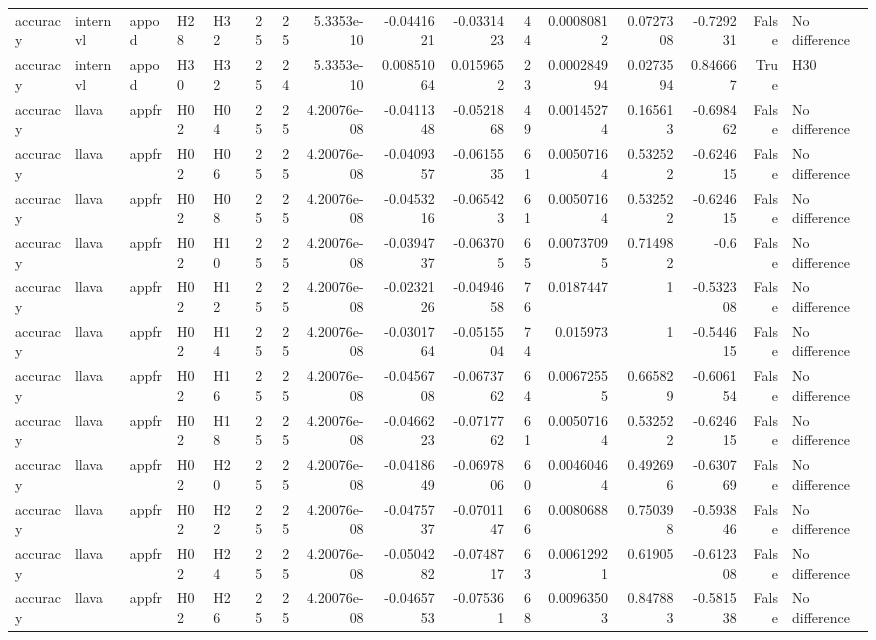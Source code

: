 \begin{longtable}{lllllrrrrrrrrrrl}
accuracy & internvl & appod & H28 & H32 & 25 & 25 & 5.3353e-10 & -0.0441621 & -0.0331423 & 44 & 0.00080812 & 0.0727308 & -0.729231 & False & No difference \\
accuracy & internvl & appod & H30 & H32 & 25 & 24 & 5.3353e-10 & 0.00851064 & 0.0159652 & 23 & 0.000284994 & 0.0273594 & 0.846667 & True & H30 \\
accuracy & llava & appfr & H02 & H04 & 25 & 25 & 4.20076e-08 & -0.0411348 & -0.0521868 & 49 & 0.00145274 & 0.165613 & -0.698462 & False & No difference \\
accuracy & llava & appfr & H02 & H06 & 25 & 25 & 4.20076e-08 & -0.0409357 & -0.0615535 & 61 & 0.00507164 & 0.532522 & -0.624615 & False & No difference \\
accuracy & llava & appfr & H02 & H08 & 25 & 25 & 4.20076e-08 & -0.0453216 & -0.065423 & 61 & 0.00507164 & 0.532522 & -0.624615 & False & No difference \\
accuracy & llava & appfr & H02 & H10 & 25 & 25 & 4.20076e-08 & -0.0394737 & -0.063705 & 65 & 0.00737095 & 0.714982 & -0.6 & False & No difference \\
accuracy & llava & appfr & H02 & H12 & 25 & 25 & 4.20076e-08 & -0.0232126 & -0.0494658 & 76 & 0.0187447 & 1 & -0.532308 & False & No difference \\
accuracy & llava & appfr & H02 & H14 & 25 & 25 & 4.20076e-08 & -0.0301764 & -0.0515504 & 74 & 0.015973 & 1 & -0.544615 & False & No difference \\
accuracy & llava & appfr & H02 & H16 & 25 & 25 & 4.20076e-08 & -0.0456708 & -0.0673762 & 64 & 0.00672555 & 0.665829 & -0.606154 & False & No difference \\
accuracy & llava & appfr & H02 & H18 & 25 & 25 & 4.20076e-08 & -0.0466223 & -0.0717762 & 61 & 0.00507164 & 0.532522 & -0.624615 & False & No difference \\
accuracy & llava & appfr & H02 & H20 & 25 & 25 & 4.20076e-08 & -0.0418649 & -0.0697806 & 60 & 0.00460464 & 0.492696 & -0.630769 & False & No difference \\
accuracy & llava & appfr & H02 & H22 & 25 & 25 & 4.20076e-08 & -0.0475737 & -0.0701147 & 66 & 0.0080688 & 0.750398 & -0.593846 & False & No difference \\
accuracy & llava & appfr & H02 & H24 & 25 & 25 & 4.20076e-08 & -0.0504282 & -0.0748717 & 63 & 0.00612921 & 0.61905 & -0.612308 & False & No difference \\
accuracy & llava & appfr & H02 & H26 & 25 & 25 & 4.20076e-08 & -0.0465753 & -0.075361 & 68 & 0.00963503 & 0.847883 & -0.581538 & False & No difference \\

\end{longtable}
